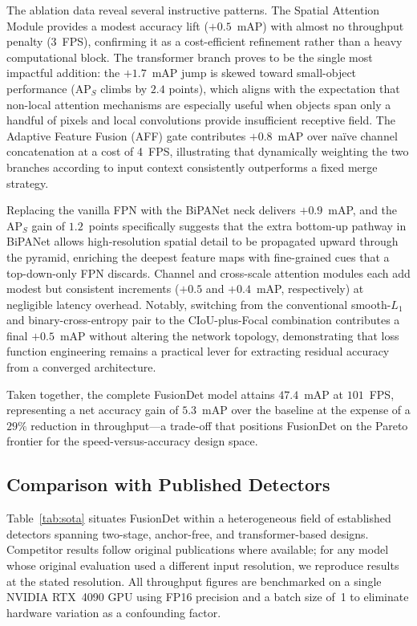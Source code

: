 The ablation data reveal several instructive patterns. The Spatial Attention
Module provides a modest accuracy lift ($+0.5$~mAP) with almost no
throughput penalty (3~FPS), confirming it as a cost-efficient refinement
rather than a heavy computational block. The transformer branch proves to be
the single most impactful addition: the $+1.7$~mAP jump is skewed toward
small-object performance ($\text{AP}_{S}$ climbs by $2.4$ points), which
aligns with the expectation that non-local attention mechanisms are especially
useful when objects span only a handful of pixels and local convolutions
provide insufficient receptive field. The Adaptive Feature Fusion (AFF)
gate contributes $+0.8$~mAP over na\"ive channel concatenation at a cost of
4~FPS, illustrating that dynamically weighting the two branches according to
input context consistently outperforms a fixed merge strategy.

Replacing the vanilla FPN with the BiPANet neck delivers $+0.9$~mAP, and
the $\text{AP}_{S}$ gain of $1.2$~points specifically suggests that the
extra bottom-up pathway in BiPANet allows high-resolution spatial detail to
be propagated upward through the pyramid, enriching the deepest feature maps
with fine-grained cues that a top-down-only FPN discards. Channel and
cross-scale attention modules each add modest but consistent increments
($+0.5$ and $+0.4$~mAP, respectively) at negligible latency overhead.
Notably, switching from the conventional smooth-$L_1$ and binary-cross-entropy
pair to the CIoU-plus-Focal combination contributes a final $+0.5$~mAP
without altering the network topology, demonstrating that loss function
engineering remains a practical lever for extracting residual accuracy from a
converged architecture.

Taken together, the complete FusionDet model attains $47.4$~mAP at
$101$~FPS, representing a net accuracy gain of $5.3$~mAP over the baseline
at the expense of a $29\%$ reduction in throughput—a trade-off that positions
FusionDet on the Pareto frontier for the speed-versus-accuracy design space.

\subsection{Comparison with Published Detectors}

Table~\ref{tab:sota} situates FusionDet within a heterogeneous field of
established detectors spanning two-stage, anchor-free, and
transformer-based designs. Competitor results follow original publications
where available; for any model whose original evaluation used a different
input resolution, we reproduce results at the stated resolution. All
throughput figures are benchmarked on a single NVIDIA RTX~4090 GPU using
FP16 precision and a batch size of~1 to eliminate hardware variation as a
confounding factor.

